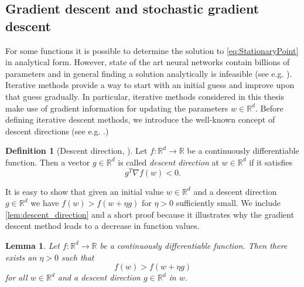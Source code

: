 \documentclass[12pt]{article}
\newtheorem{lemma}[lemma]{Lemma}
\theoremstyle{definition}
\newtheorem{definition}[definition]{Definition}
\numberwithin{equation}{section}
\newcommand{\R}{\mathbb{R}}
\begin{document}
\subsection{Gradient descent and stochastic gradient descent}
\label{subsec:gd_sgd}
For some functions it is possible to determine the solution to \eqref{eq:StationaryPoint} in analytical form. However, state of the art neural networks contain billions of parameters and in general finding a solution analytically is infeasible (see e.g. \cite{brownLanguageModelsAre2020}). Iterative methods provide a way to start with an initial guess and improve upon that guess gradually. In particular, iterative methods considered in this thesis make use of gradient information for updating the parameters $w \in \R^d$. Before defining iterative descent methods, we introduce the well-known concept of descent directions (see e.g. \cite{nocedalNumericalOptimization2006}.) 
\begin{definition}[Descent direction, ]
  Let $f: \R^d \rightarrow \R$ be a continuously differentiable function. Then a vector $g \in \R^d$ is called \emph{descent direction} at $w \in \R^d$ if it satisfies 
  \begin{equation}
    \label{eq:descent_direction}
    g^T \nabla f(w) < 0.
  \end{equation} 
\end{definition}
It is easy to show that given an initial value $w \in \R^d$ and a descent direction $g \in \R^d$ we have $f(w) > f(w + \eta g)$ for $\eta > 0$ sufficiently small. We include \autoref{lem:descent_direction} and a short proof because it illustrates why the gradient descent method leads to a decrease in function values.
\begin{lemma}
  \label{lem:descent_direction}
  Let $f : \R^d \rightarrow \R$ be a continuously differentiable function. Then there exists an $\eta > 0$ such that
  \begin{equation}
    f(w) > f(w + \eta g)
  \end{equation}
  for all $w \in \R^d$ and a descent direction $g \in \R^d$ in $w$.
\end{lemma}
\end{document}
